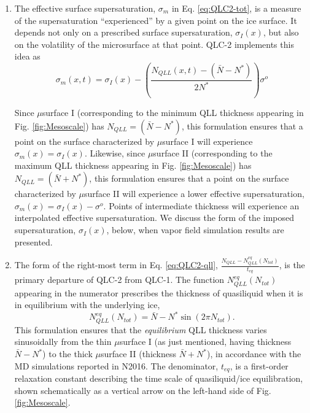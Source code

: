 \documentclass[draft]{agujournal2019}
\begin{document}
\begin{enumerate}
    \item The effective surface supersaturation, $\sigma_m$ in Eq. \ref{eq:QLC2-tot}, is a measure of the supersaturation ``experienced'' by a given point on the ice surface. It depends not only on a prescribed surface supersaturation, $\sigma_I(x)$, but also on the volatility of the microsurface at that point. QLC-2 implements this idea as
    \begin{equation}
        \sigma_m(x,t) = \sigma_I(x) - \left(\frac{N_{QLL}(x,t) - (\bar{N} - N^*)}{2N^*}\right)\sigma^o
        \label{eq:sigmaM}
    \end{equation}
    
    Since $\mu$surface I (corresponding to the minimum QLL thickness appearing in Fig. \ref{fig:Mesoscale}) has $N_{QLL}=(\bar{N} - N^*)$, this formulation ensures that a point on the surface characterized by $\mu$surface I will experience $\sigma_m(x) = \sigma_I(x)$. 
    Likewise, since $\mu$surface II (corresponding to the maximum QLL thickness appearing in Fig. \ref{fig:Mesoscale}) has $N_{QLL}=(\bar{N} + N^*)$, this formulation ensures that a point on the surface characterized by $\mu$surface II will experience a lower effective supersaturation, $\sigma_m(x) = \sigma_I(x)-\sigma^o$. Points of intermediate thickness will experience an interpolated effective supersaturation. We discuss the form of the imposed supersaturation, $\sigma_I(x)$, below, when vapor field simulation results are presented.    
         
    \item The form of the right-most term in Eq. \ref{eq:QLC2-qll}, $\frac{N_{QLL}-N_{QLL}^{eq}(N_{tot})}{t_{eq}}$, is the primary departure of QLC-2 from QLC-1. The function $N_{QLL}^{eq}(N_{tot})$ appearing in the numerator prescribes the thickness of quasiliquid when it is in equilibrium with the underlying ice, 
    \begin{equation}
        N_{QLL}^{eq}(N_{tot}) = \bar{N} - N^*\sin(2\pi N_{tot}).
        \label{eq:NeqQLL}
    \end{equation}
    This formulation ensures that the \textit{equilibrium} QLL thickness varies sinusoidally from the thin $\mu$surface I (as just mentioned, having thickness $\bar{N}-N^*$) to the thick $\mu$surface II (thickness $\bar{N}+N^*$), in accordance with the MD simulations reported in N2016. The denominator, $t_{eq}$, is a first-order relaxation constant describing the time scale of quasiliquid/ice equilibration, shown schematically as a vertical arrow on the left-hand side of Fig. \ref{fig:Mesoscale}.  
    

\end{enumerate}
\end{document}
